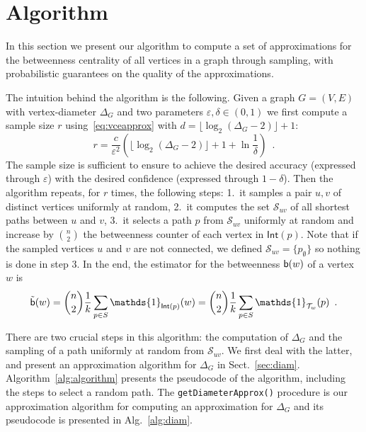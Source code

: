 \section{Algorithm}\label{sec:algo}
In this section we present our algorithm to compute a set of approximations for the
betweenness centrality of all vertices in a graph through sampling, with
probabilistic guarantees on the quality of the approximations.

The intuition behind the algorithm is the following. Given a graph $G=(V,E)$
with vertex-diameter $\Delta_G$ and two parameters $\varepsilon,\delta\in(0,1)$
we first compute a sample size $r$ using~\eqref{eq:vceapprox} with
$d=\lfloor\log_2(\Delta_G-2)\rfloor+1$:
\begin{equation}\label{eq:samplesize}
r=\frac{c}{\varepsilon^2}\left(\lfloor\log_2(\Delta_G-2)\rfloor+1+\ln\frac{1}{\delta}\right)\enspace.
\end{equation}
The sample size is sufficient to ensure to achieve the desired accuracy
(expressed through $\varepsilon$) with the desired confidence (expressed through
$1-\delta$). Then the algorithm repeats, for $r$ times, the following steps:
1.~it samples a pair $u,v$ of distinct vertices uniformly at random, 2.~it
computes the set $\mathcal{S}_{uv}$ of all shortest paths between $u$ and $v$,
3.~it selects a path $p$ from $\mathcal{S}_{uv}$ uniformly at random and
increase by $\binom{n}{2}$ the betweenness counter of each vertex in
$\mathsf{Int}(p)$. Note that if the sampled vertices $u$ and $v$ are not
connected, we defined $\mathcal{S}_{uv}=\{p_\emptyset\}$ so nothing is done in
step 3. In the end, the estimator for the betweenness $\mathsf{b}(w)$ of a vertex $w$
is 
\[
\tilde\betw(w) = \binom{n}{2}\frac{1}{k}\sum_{p\in S}
\mathds{1}_{\mathsf{Int}(p)}(w) = \binom{n}{2}\frac{1}{k}\sum_{p\in S}
\mathds{1}_{\mathcal{T}_w}(p)\enspace.
\]

There are two crucial steps in this algorithm: the computation of $\Delta_G$ and
the sampling of a path uniformly at random from $\mathcal{S}_{uv}$. We first
deal with the latter, and present an approximation algorithm for $\Delta_G$ in
Sect.~\ref{sec:diam}. Algorithm~\ref{alg:algorithm} presents the
pseudocode of the algorithm, including the steps to select a random path.
The \texttt{getDiameterApprox()} procedure is our approximation algorithm for
computing an approximation for $\Delta_G$ and its pseudocode is presented in
Alg.~\ref{alg:diam}.

